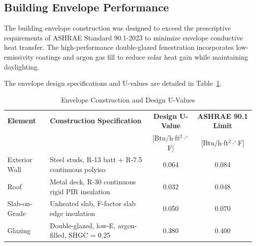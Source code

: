 \subsection{Building Envelope Performance}
The building envelope construction was designed to exceed the prescriptive requirements of ASHRAE Standard 90.1-2023 \cite{ashrae90} to minimize envelope conductive heat transfer. The high-performance double-glazed fenestration incorporates low-emissivity coatings and argon gas fill to reduce solar heat gain while maintaining daylighting.

The envelope design specifications and U-values are detailed in Table~\ref{tab:u_values}.

\begin{table}[htbp]
\centering
\caption{Envelope Construction and Design U-Values}
\label{tab:u_values}
\begin{tabularx}{\textwidth}{l X c c}
\toprule
\textbf{Element} & \textbf{Construction Specification} & \textbf{Design U-Value} & \textbf{ASHRAE 90.1 Limit} \\
                 &                                     & [Btu/h$\cdot$ft$^{2}\cdot^{\circ}$F] & [Btu/h$\cdot$ft$^{2}\cdot^{\circ}$F] \\
\midrule
Exterior Wall & Steel studs, R-13 batt + R-7.5 continuous polyiso & 0.064 & 0.084 \\
Roof & Metal deck, R-30 continuous rigid PIR insulation & 0.032 & 0.048 \\
Slab-on-Grade & Unheated slab, F-factor slab edge insulation & 0.050 & 0.070 \\
Glazing & Double-glazed, low-E, argon-filled, SHGC = 0.25 & 0.380 & 0.400 \\
\bottomrule
\end{tabularx}
\end{table}
